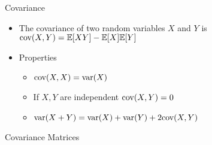 \documentclass{beamer}
\begin{document}
\begin{frame}{Covariance}  
\begin{itemize}
 \item The covariance of two random variables $X$ and $Y$ is $\mbox{cov}(X, Y) = \mathbb{E}[XY] - \mathbb{E}[X]\mathbb{E}[Y]$ 
 \item Properties 
 \begin{itemize}
 \item $\mbox{cov}(X, X) = \mbox{var}(X)$ 
 \item If $X, Y$ are independent $\mbox{cov}(X, Y) = 0$ 
 \item $\mbox{var}(X + Y) = \mbox{var}(X) + \mbox{var}(Y) + 2\mbox{cov}(X, Y)$ 
 \end{itemize} 
\end{itemize}
\end{frame}

\begin{frame}{Covariance Matrices} 
 
\end{frame}
\end{document}
